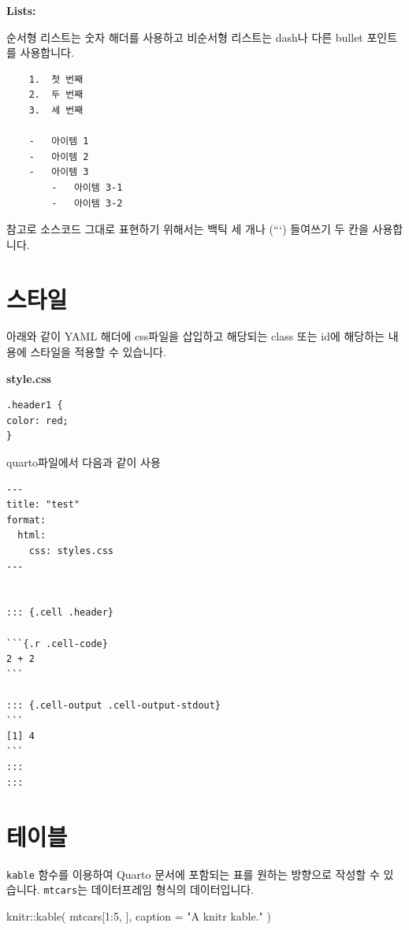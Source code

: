 \documentclass[
  a4paper,
]{book}
\newenvironment{Shaded}{\begin{snugshade}}{\end{snugshade}}
\newcommand{\AttributeTok}[1]{\textcolor[rgb]{0.40,0.45,0.13}{#1}}
\newcommand{\DecValTok}[1]{\textcolor[rgb]{0.68,0.00,0.00}{#1}}
\newcommand{\FunctionTok}[1]{\textcolor[rgb]{0.28,0.35,0.67}{#1}}
\newcommand{\NormalTok}[1]{\textcolor[rgb]{0.00,0.23,0.31}{#1}}
\newcommand{\SpecialCharTok}[1]{\textcolor[rgb]{0.37,0.37,0.37}{#1}}
\newcommand{\StringTok}[1]{\textcolor[rgb]{0.13,0.47,0.30}{#1}}
\begin{document}
\textbf{Lists:}

순서형 리스트는 숫자 해더를 사용하고 비순서형 리스트는 dash나 다른
bullet 포인트를 사용합니다.

\begin{verbatim}
    1.  첫 번째
    2.  두 번째
    3.  세 번째

    -   아이템 1
    -   아이템 2
    -   아이템 3
        -   아이템 3-1
        -   아이템 3-2
\end{verbatim}

참고로 소스코드 그대로 표현하기 위해서는 백틱 세 개나 (```) 들여쓰기 두
칸을 사용합니다.

\hypertarget{uxc2a4uxd0c0uxc77c-1}{%
\section{스타일}\label{uxc2a4uxd0c0uxc77c-1}}

아래와 같이 YAML 해더에 css파일을 삽입하고 해당되는 class 또는 id에
해당하는 내용에 스타일을 적용할 수 있습니다.

\textbf{style.css}

\begin{verbatim}
.header1 {
color: red;
}
\end{verbatim}

quarto파일에서 다음과 같이 사용

\begin{verbatim}
---
title: "test"
format:
  html:
    css: styles.css
---


::: {.cell .header}

```{.r .cell-code}
2 + 2
```

::: {.cell-output .cell-output-stdout}
```
[1] 4
```
:::
:::
\end{verbatim}

\hypertarget{uxd14cuxc774uxbe14-1}{%
\section{테이블}\label{uxd14cuxc774uxbe14-1}}

\texttt{kable} 함수를 이용하여 Quarto 문서에 포함되는 표를 원하는
방향으로 작성할 수 있습니다. \texttt{mtcars}는 데이터프레임 형식의
데이터입니다.

\begin{Shaded}
\begin{Highlighting}[]
\NormalTok{knitr}\SpecialCharTok{::}\FunctionTok{kable}\NormalTok{(}
\NormalTok{  mtcars[}\DecValTok{1}\SpecialCharTok{:}\DecValTok{5}\NormalTok{, ], }
  \AttributeTok{caption =} \StringTok{"A knitr kable."}
\NormalTok{)}
\end{Highlighting}
\end{Shaded}
\end{document}
